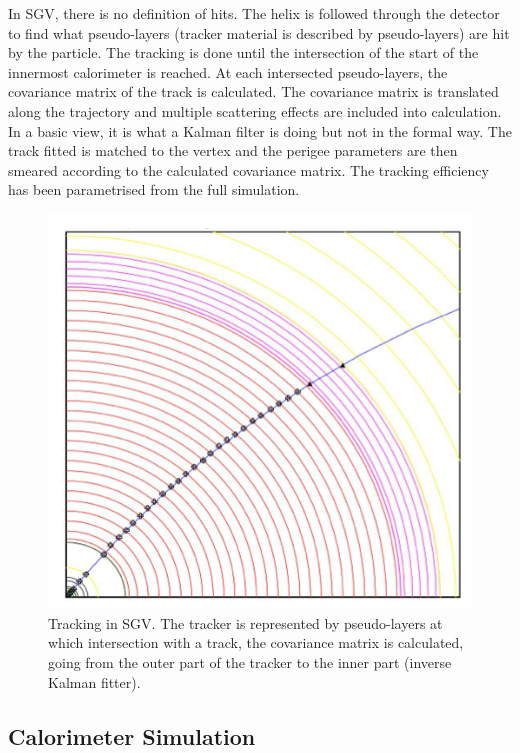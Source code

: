 \documentclass[a4paper,12pt]{article}
\begin{document}
In SGV, there is no definition of hits. The helix is followed through the detector to find what pseudo-layers (tracker material is described by pseudo-layers) are hit by the particle. The tracking is done until the intersection of the start of the innermost calorimeter is reached. At each intersected pseudo-layers, the covariance matrix of the track is calculated.  The covariance matrix is translated along the trajectory and multiple scattering effects are included into calculation. 
In a basic view, it is what a Kalman filter is doing but not in the formal way. The track fitted is matched to the vertex and the perigee parameters are then smeared according to the calculated covariance matrix. The tracking efficiency has been parametrised from the full simulation.

\begin{figure}[!h]
   \centering
   \includegraphics[scale=0.3]{Tracking_SGV.png} 
      \caption{Tracking in SGV. The tracker is represented by pseudo-layers at which intersection with a track, the covariance matrix is calculated, going from the outer part of the tracker to the inner part (inverse Kalman fitter).}
   \label{fig:tracking_sgv}
\end{figure}

\subsection{Calorimeter Simulation}
\end{document}
